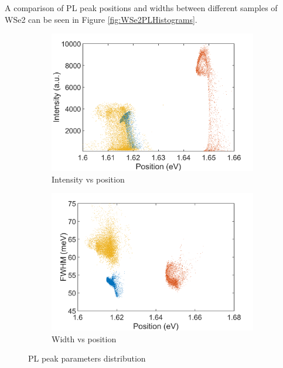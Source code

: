 A comparison of PL peak positions and widths between different samples of WSe2 can be seen in Figure \ref{fig:WSe2PLHistograms}.

\begin{figure}[!h]
	\begin{center}
		\begin{subfigure}[b]{0.4\textwidth}
			\includegraphics[scale=0.2]{WSe2/WSe2PositionIntensityScatterComparison.png}
			\caption{Intensity vs position}
			\label{fig:WSe2PositionIntensityScatterComparison}
		\end{subfigure}
		\qquad
		\begin{subfigure}[b]{0.4\textwidth}
			\includegraphics[scale=0.2]{WSe2/Wse2PositionWidthScatterComparison.png}
			\caption{Width vs position}
			\label{fig:WSe2PositionWidthScatterComparison}
		\end{subfigure}
		\caption{PL peak parameters distribution}
		\label{fig:WSe2ScatterComparison}
	\end{center}
\end{figure}

